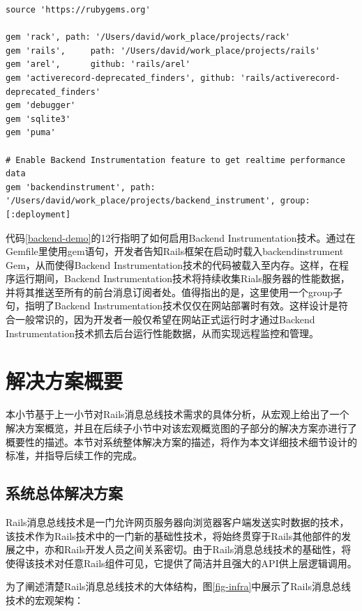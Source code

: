 \begin{lstlisting}[caption={启用Auto-Realod技术}, label=backend-demo]
source 'https://rubygems.org'

gem 'rack', path: '/Users/david/work_place/projects/rack'
gem 'rails',     path: '/Users/david/work_place/projects/rails'
gem 'arel',      github: 'rails/arel'
gem 'activerecord-deprecated_finders', github: 'rails/activerecord-deprecated_finders'
gem 'debugger'
gem 'sqlite3'
gem 'puma'

# Enable Backend Instrumentation feature to get realtime performance data
gem 'backendinstrument', path: '/Users/david/work_place/projects/backend_instrument', group: [:deployment]
\end{lstlisting}

代码\ref{backend-demo}的12行指明了如何启用Backend Instrumentation技术。通过在Gemfile里使用gem语句，开发者告知Rails框架在启动时载入backendinstrument Gem，从而使得Backend Instrumentation技术的代码被载入至内存。这样，在程序运行期间，Backend Instrumentation技术将持续收集Rials服务器的性能数据，并将其推送至所有的前台消息订阅者处。值得指出的是，这里使用一个group子句，指明了Backend Instrumentation技术仅仅在网站部署时有效。这样设计是符合一般常识的，因为开发者一般仅希望在网站正式运行时才通过Backend Instrumentation技术抓去后台运行性能数据，从而实现远程监控和管理。

\section{解决方案概要}
本小节基于上一小节对Rails消息总线技术需求的具体分析，从宏观上给出了一个解决方案概览，并且在后续子小节中对该宏观概览图的子部分的解决方案亦进行了概要性的描述。本节对系统整体解决方案的描述，将作为本文详细技术细节设计的标准，并指导后续工作的完成。

\subsection{系统总体解决方案}
Rails消息总线技术是一门允许网页服务器向浏览器客户端发送实时数据的技术，该技术作为Rails技术中的一门新的基础性技术，将始终贯穿于Rails其他部件的发展之中，亦和Rails开发人员之间关系密切。由于Rails消息总线技术的基础性，将使得该技术对任意Rails组件可见，它提供了简洁并且强大的API供上层逻辑调用。

为了阐述清楚Rails消息总线技术的大体结构，图\ref{fig-infra}中展示了Rails消息总线技术的宏观架构：

